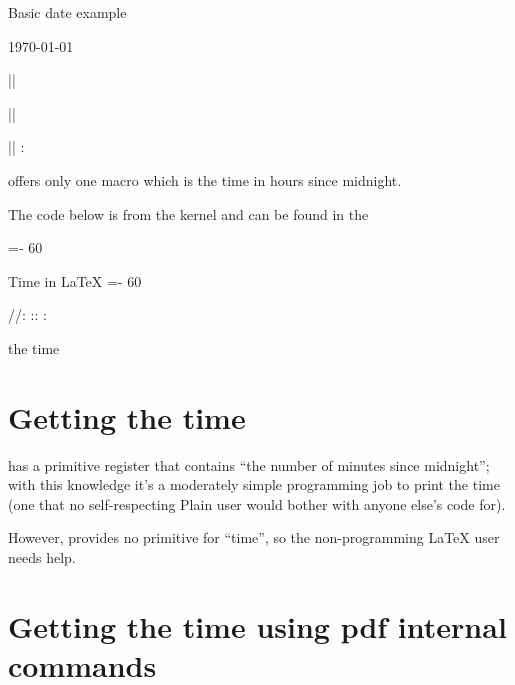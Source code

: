\begin{texexample}{Basic date example}{}
\the\day

\the\month

\the\year

\meaning\today
\end{texexample}

{
\makeatletter
|\the\month| \the\month

|\the\day| \the\day

|\the\time| \two@digits{\the\count@}:
\makeatother}

\tex offers only one macro \cmd{\time} which is the time in hours since midnight.


The code below is from the \latex kernel and can be found in the 

\begin{teX}
\count@\time
\divide{}
=-\count@
\multiply{} 60
\advance{} \time

\edef\today{%
  \the\year/\two@digits{\the\month}/\two@digits{\the\day}:%
  \two@digits{\the\count@}:\two@digits{\the\count2}
 }
\end{teX}

\begin{texexample}{Time in LaTeX}{}
\makeatletter
\count@\time
\divide{}
=-\count@
\multiply{} 60
\advance{} \time

\edef\today{%
\the\year/\two@digits{\the\month}/\two@digits{\the\day}:%
\two@digits{\the\count@}:}


\today:   \the{}:  \the\count@

the time \the\time
\makeatother
\end{texexample}




\section{Getting the time}

\tex has a primitive register that contains “the number of minutes since midnight”; with this knowledge it’s a moderately simple programming job to print the time (one that no self-respecting Plain \tex user would bother with anyone else’s code for).

However, \latex provides no primitive for “time”, so the non-programming LaTeX user needs help.


\section*{Getting the time using pdf internal commands}


